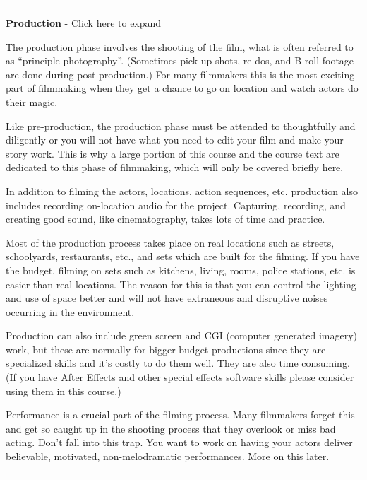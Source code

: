 \documentclass[
]{book}
\begin{document}
\begin{center}\rule{0.5\linewidth}{0.5pt}\end{center}

\textbf{Production} - Click here to expand

The production phase involves the shooting of the film, what is often referred to as ``principle photography''. (Sometimes pick-up shots, re-dos, and B-roll footage are done during post-production.) For many filmmakers this is the most exciting part of filmmaking when they get a chance to go on location and watch actors do their magic.

Like pre-production, the production phase must be attended to thoughtfully and diligently or you will not have what you need to edit your film and make your story work. This is why a large portion of this course and the course text are dedicated to this phase of filmmaking, which will only be covered briefly here.

In addition to filming the actors, locations, action sequences, etc. production also includes recording on-location audio for the project. Capturing, recording, and creating good sound, like cinematography, takes lots of time and practice.

Most of the production process takes place on real locations such as streets, schoolyards, restaurants, etc., and sets which are built for the filming. If you have the budget, filming on sets such as kitchens, living, rooms, police stations, etc. is easier than real locations. The reason for this is that you can control the lighting and use of space better and will not have extraneous and disruptive noises occurring in the environment.

Production can also include green screen and CGI (computer generated imagery) work, but these are normally for bigger budget productions since they are specialized skills and it's costly to do them well. They are also time consuming. (If you have After Effects and other special effects software skills please consider using them in this course.)

Performance is a crucial part of the filming process. Many filmmakers forget this and get so caught up in the shooting process that they overlook or miss bad acting. Don't fall into this trap. You want to work on having your actors deliver believable, motivated, non-melodramatic performances. More on this later.

\begin{center}\rule{0.5\linewidth}{0.5pt}\end{center}
\end{document}
